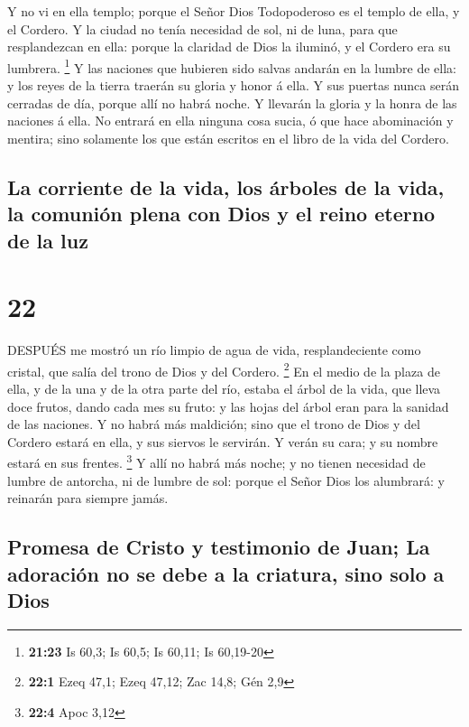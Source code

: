  Y no vi en ella templo; porque el Señor Dios Todopoderoso
es el templo de ella, y el Cordero.  Y la ciudad no tenía
necesidad de sol, ni de luna, para que resplandezcan en ella: porque la
claridad de Dios la iluminó, y el Cordero era su lumbrera. \footnote{\textbf{21:23}
  Is 60,3; Is 60,5; Is 60,11; Is 60,19-20}  Y las naciones
que hubieren sido salvas andarán en la lumbre de ella: y los reyes de la
tierra traerán su gloria y honor á ella.  Y sus puertas
nunca serán cerradas de día, porque allí no habrá noche.  Y
llevarán la gloria y la honra de las naciones á ella.  No
entrará en ella ninguna cosa sucia, ó que hace abominación y mentira;
sino solamente los que están escritos en el libro de la vida del
Cordero.

\hypertarget{la-corriente-de-la-vida-los-uxe1rboles-de-la-vida-la-comuniuxf3n-plena-con-dios-y-el-reino-eterno-de-la-luz}{%
\subsection{La corriente de la vida, los árboles de la vida, la comunión
plena con Dios y el reino eterno de la
luz}\label{la-corriente-de-la-vida-los-uxe1rboles-de-la-vida-la-comuniuxf3n-plena-con-dios-y-el-reino-eterno-de-la-luz}}

\hypertarget{section-21}{%
\section{22}\label{section-21}}

 DESPUÉS me mostró un río limpio de agua de vida,
resplandeciente como cristal, que salía del trono de Dios y del Cordero.
\footnote{\textbf{22:1} Ezeq 47,1; Ezeq 47,12; Zac 14,8; Gén 2,9}
 En el medio de la plaza de ella, y de la una y de la otra
parte del río, estaba el árbol de la vida, que lleva doce frutos, dando
cada mes su fruto: y las hojas del árbol eran para la sanidad de las
naciones.  Y no habrá más maldición; sino que el trono de
Dios y del Cordero estará en ella, y sus siervos le servirán.
 Y verán su cara; y su nombre estará en sus frentes.
\footnote{\textbf{22:4} Apoc 3,12}  Y allí no habrá más
noche; y no tienen necesidad de lumbre de antorcha, ni de lumbre de sol:
porque el Señor Dios los alumbrará: y reinarán para siempre jamás.

\hypertarget{promesa-de-cristo-y-testimonio-de-juan-la-adoraciuxf3n-no-se-debe-a-la-criatura-sino-solo-a-dios}{%
\subsection{Promesa de Cristo y testimonio de Juan; La adoración no se
debe a la criatura, sino solo a
Dios}\label{promesa-de-cristo-y-testimonio-de-juan-la-adoraciuxf3n-no-se-debe-a-la-criatura-sino-solo-a-dios}}

